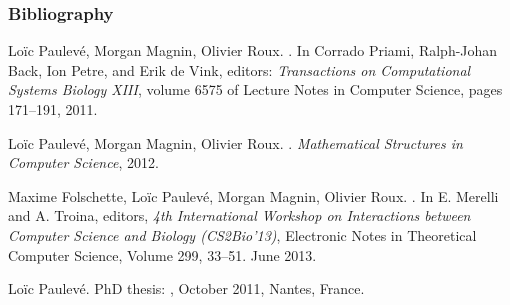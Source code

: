 \begin{frame}[c]
  \frametitle{Bibliography}

\small
\setlength{\parindent}{-1em}
\setlength{\parskip}{0.5em}

\tcitebullet Loïc Paulevé, Morgan Magnin, Olivier Roux. . In Corrado Priami, Ralph-Johan Back, Ion Petre, and Erik de Vink, editors: \textit{Transactions on Computational Systems Biology XIII}, volume 6575 of Lecture Notes in Computer Science, pages 171--191, 2011.

\tcitebullet Loïc Paulevé, Morgan Magnin, Olivier Roux. . \textit{Mathematical Structures in Computer Science}, 2012.




\tcitebullet Maxime Folschette, Loïc Paulevé, Morgan Magnin, Olivier Roux. . In E. Merelli and A. Troina, editors, \textit{4th International Workshop on Interactions between Computer Science and Biology (CS2Bio’13)}, Electronic Notes in Theoretical Computer Science, Volume 299, 33–51. June 2013.

\tcitebullet Loïc Paulevé. PhD thesis: , October 2011, Nantes, France.



\end{frame}
